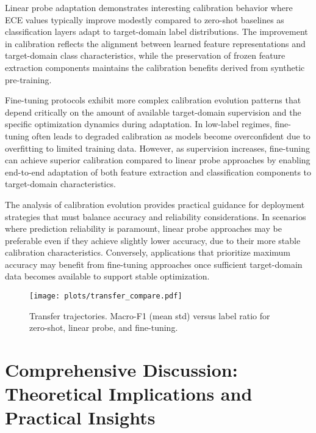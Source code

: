 \documentclass[journal]{IEEEtran}
\begin{document}
Linear probe adaptation demonstrates interesting calibration behavior where ECE values typically improve modestly compared to zero-shot baselines as classification layers adapt to target-domain label distributions. The improvement in calibration reflects the alignment between learned feature representations and target-domain class characteristics, while the preservation of frozen feature extraction components maintains the calibration benefits derived from synthetic pre-training.

Fine-tuning protocols exhibit more complex calibration evolution patterns that depend critically on the amount of available target-domain supervision and the specific optimization dynamics during adaptation. In low-label regimes, fine-tuning often leads to degraded calibration as models become overconfident due to overfitting to limited training data. However, as supervision increases, fine-tuning can achieve superior calibration compared to linear probe approaches by enabling end-to-end adaptation of both feature extraction and classification components to target-domain characteristics.

The analysis of calibration evolution provides practical guidance for deployment strategies that must balance accuracy and reliability considerations. In scenarios where prediction reliability is paramount, linear probe approaches may be preferable even if they achieve slightly lower accuracy, due to their more stable calibration characteristics. Conversely, applications that prioritize maximum accuracy may benefit from fine-tuning approaches once sufficient target-domain data becomes available to support stable optimization.

\begin{figure}[t]
\centering
\texttt{[image: plots/transfer\_compare.pdf]}
\caption{Transfer trajectories. Macro-F1 (mean\,\textpm\,std) versus label ratio for zero-shot, linear probe, and fine-tuning.}
\label{fig:transfer_compare}
\end{figure}

\section{Comprehensive Discussion: Theoretical Implications and Practical Insights}
\end{document}
